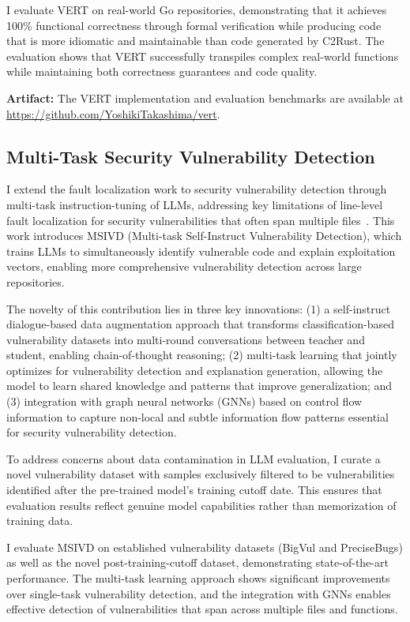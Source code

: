 \documentclass[12pt,openany,oneside,table]{cmuthesis}
\begin{document}
I evaluate VERT on real-world Go repositories, demonstrating that it achieves 100\% functional correctness through formal verification while producing code that is more idiomatic and maintainable than code generated by C2Rust. The evaluation shows that VERT successfully transpiles complex real-world functions while maintaining both correctness guarantees and code quality.

\textbf{Artifact:} The VERT implementation and evaluation benchmarks are available at \url{https://github.com/YoshikiTakashima/vert}.

\subsection{Multi-Task Security Vulnerability Detection}

I extend the fault localization work to security vulnerability detection through multi-task instruction-tuning of LLMs, addressing key limitations of line-level fault localization for security vulnerabilities that often span multiple files~\cite{yang2024security}. This work introduces MSIVD (Multi-task Self-Instruct Vulnerability Detection), which trains LLMs to simultaneously identify vulnerable code and explain exploitation vectors, enabling more comprehensive vulnerability detection across large repositories.

The novelty of this contribution lies in three key innovations: (1) a self-instruct dialogue-based data augmentation approach that transforms classification-based vulnerability datasets into multi-round conversations between teacher and student, enabling chain-of-thought reasoning; (2) multi-task learning that jointly optimizes for vulnerability detection and explanation generation, allowing the model to learn shared knowledge and patterns that improve generalization; and (3) integration with graph neural networks (GNNs) based on control flow information to capture non-local and subtle information flow patterns essential for security vulnerability detection.

To address concerns about data contamination in LLM evaluation, I curate a novel vulnerability dataset with samples exclusively filtered to be vulnerabilities identified after the pre-trained model's training cutoff date. This ensures that evaluation results reflect genuine model capabilities rather than memorization of training data.

I evaluate MSIVD on established vulnerability datasets (BigVul and PreciseBugs) as well as the novel post-training-cutoff dataset, demonstrating state-of-the-art performance. The multi-task learning approach shows significant improvements over single-task vulnerability detection, and the integration with GNNs enables effective detection of vulnerabilities that span across multiple files and functions.
\end{document}
